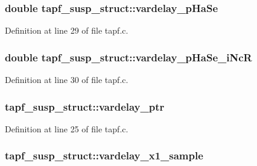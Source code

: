 \subsubsection[{\texorpdfstring{vardelay\+\_\+p\+Ha\+Se}{vardelay_pHaSe}}]{\setlength{\rightskip}{0pt plus 5cm}double tapf\+\_\+susp\+\_\+struct\+::vardelay\+\_\+p\+Ha\+Se}\hypertarget{structtapf__susp__struct_a3af8412cc866f36cd13a276e69bb1ce7}{}\label{structtapf__susp__struct_a3af8412cc866f36cd13a276e69bb1ce7}


Definition at line 29 of file tapf.\+c.

\subsubsection[{\texorpdfstring{vardelay\+\_\+p\+Ha\+Se\+\_\+i\+NcR}{vardelay_pHaSe_iNcR}}]{\setlength{\rightskip}{0pt plus 5cm}double tapf\+\_\+susp\+\_\+struct\+::vardelay\+\_\+p\+Ha\+Se\+\_\+i\+NcR}\hypertarget{structtapf__susp__struct_a674adc2fae676ce338e7df03e834d3cb}{}\label{structtapf__susp__struct_a674adc2fae676ce338e7df03e834d3cb}


Definition at line 30 of file tapf.\+c.

\subsubsection[{\texorpdfstring{vardelay\+\_\+ptr}{vardelay_ptr}}]{ tapf\+\_\+susp\+\_\+struct\+::vardelay\+\_\+ptr}\hypertarget{structtapf__susp__struct_a8429054bbb7f93d73b67bdefaf002194}{}\label{structtapf__susp__struct_a8429054bbb7f93d73b67bdefaf002194}


Definition at line 25 of file tapf.\+c.

\subsubsection[{\texorpdfstring{vardelay\+\_\+x1\+\_\+sample}{vardelay_x1_sample}}]{ tapf\+\_\+susp\+\_\+struct\+::vardelay\+\_\+x1\+\_\+sample}\hypertarget{structtapf__susp__struct_a88520f81c2866da73f26e3608a0436bc}{}\label{structtapf__susp__struct_a88520f81c2866da73f26e3608a0436bc}


